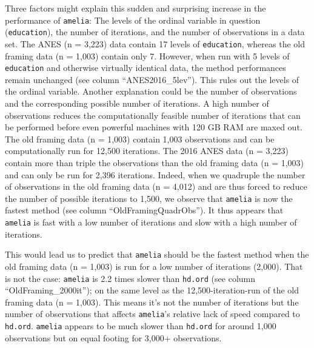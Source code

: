 \documentclass[12pt,econ]{sources/authesis}
\begin{document}
Three factors might explain this sudden and surprising increase in the performance of \texttt{amelia}: The levels of the ordinal variable in question (\texttt{education}), the number of iterations, and the number of observations in a data set. The ANES (n = 3,223) data contain 17 levels of \texttt{education}, whereas the old framing data (n = 1,003) contain only 7. However, when run with 5 levels of \texttt{education} and otherwise virtually identical data, the method performances remain unchanged (see column ``ANES2016\_5lev''). This rules out the levels of the ordinal variable. Another explanation could be the number of observations and the corresponding possible number of iterations. A high number of observations reduces the computationally feasible number of iterations that can be performed before even powerful machines with 120 GB RAM are maxed out. The old framing data (n = 1,003) contain 1,003 observations and can be computationally run for 12,500 iterations. The 2016 ANES data (n = 3,223) contain more than triple the observations than the old framing data (n = 1,003) and can only be run for 2,396 iterations. Indeed, when we quadruple the number of observations in the old framing data (n = 4,012) and are thus forced to reduce the number of possible iterations to 1,500, we observe that \texttt{amelia} is now the fastest method (see column ``OldFramingQuadrObs''). It thus appears that \texttt{amelia} is fast with a low number of iterations and slow with a high number of iterations.

This would lead us to predict that \texttt{amelia} should be the fastest method when the old framing data (n = 1,003) is run for a low number of iterations (2,000). That is not the case: \texttt{amelia} is 2.2 times slower than \texttt{hd.ord} (see column ``OldFraming\_2000it''); on the same level as the 12,500-iteration-run of the old framing data (n = 1,003). This means it's not the number of iterations but the number of observations that affects \texttt{amelia}'s relative lack of speed compared to \texttt{hd.ord}. \texttt{amelia} appears to be much slower than \texttt{hd.ord} for around 1,000 observations but on equal footing for 3,000+ observations.
\end{document}
